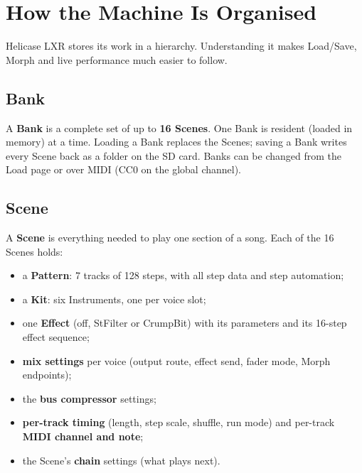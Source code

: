 \section{How the Machine Is
Organised}\label{how-the-machine-is-organised}

Helicase LXR stores its work in a hierarchy. Understanding it makes
Load/Save, Morph and live performance much easier to follow.


\subsection{Bank}\label{bank}

A \textbf{Bank} is a complete set of up to \textbf{16 Scenes}. One Bank
is resident (loaded in memory) at a time. Loading a Bank replaces the
Scenes; saving a Bank writes every Scene back as a folder on the SD
card. Banks can be changed from the Load page or over MIDI (CC0 on the
global channel).

\subsection{Scene}\label{scene}

A \textbf{Scene} is everything needed to play one section of a song.
Each of the 16 Scenes holds:

\begin{itemize}
\tightlist
\item
  a \textbf{Pattern}: 7 tracks of 128 steps, with all step data and step
  automation;
\item
  a \textbf{Kit}: six Instruments, one per voice slot;
\item
  one \textbf{Effect} (off, StFilter or CrumpBit) with its parameters
  and its 16-step effect sequence;
\item
  \textbf{mix settings} per voice (output route, effect send, fader
  mode, Morph endpoints);
\item
  the \textbf{bus compressor} settings;
\item
  \textbf{per-track timing} (length, step scale, shuffle, run mode) and
  per-track \textbf{MIDI channel and note};
\item
  the Scene's \textbf{chain} settings (what plays next).
\end{itemize}

